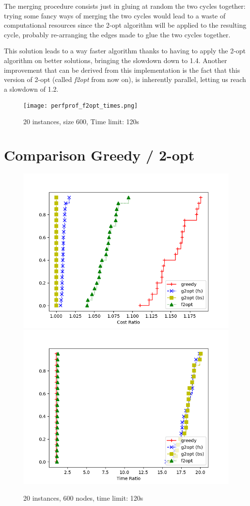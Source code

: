 The merging procedure consists just in gluing at random the two cycles together: trying some fancy ways of merging the two cycles would lead to a waste of computational resources since the 2-opt algorithm will be applied to the resulting cycle, probably re-arranging the edges made to glue the two cycles together.

This solution leads to a way faster algorithm thanks to having to apply the 2-opt algorithm on better solutions, bringing the slowdown down to 1.4. Another improvement that can be derived from this implementation is the fact that this version of 2-opt (called \textit{f2opt} from now on), is inherently parallel, letting us reach a slowdown of 1.2.

\begin{figure}[h]
    \centering
    \texttt{[image: perfprof\_f2opt\_times.png]}
    \caption*{20 instances, size 600, Time limit: 120s}
\end{figure}

\newpage 

\section{Comparison Greedy / 2-opt}

\begin{figure}[h]
    \centering
    \includegraphics*[width=.45\textwidth]{../plots/perfprof_heur_costs.png}
    \includegraphics*[width=.45\textwidth]{../plots/perfprof_heur_times.png}
    \caption*{20 instances, 600 nodes, time limit: 120s}
\end{figure}

